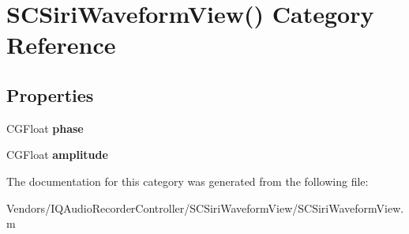 \hypertarget{category_s_c_siri_waveform_view_07_08}{}\section{S\+C\+Siri\+Waveform\+View() Category Reference}
\label{category_s_c_siri_waveform_view_07_08}
\subsection*{Properties}
\begin{DoxyCompactItemize}
\item 
\hypertarget{category_s_c_siri_waveform_view_07_08_a07e21c29861d2a9bd124efd422041512}{}C\+G\+Float {\bfseries phase}\label{category_s_c_siri_waveform_view_07_08_a07e21c29861d2a9bd124efd422041512}

\item 
\hypertarget{category_s_c_siri_waveform_view_07_08_a72038619f84c7eb4425541bae4c0bf8a}{}C\+G\+Float {\bfseries amplitude}\label{category_s_c_siri_waveform_view_07_08_a72038619f84c7eb4425541bae4c0bf8a}

\end{DoxyCompactItemize}


The documentation for this category was generated from the following file\+:\begin{DoxyCompactItemize}
\item 
Vendors/\+I\+Q\+Audio\+Recorder\+Controller/\+S\+C\+Siri\+Waveform\+View/S\+C\+Siri\+Waveform\+View.\+m\end{DoxyCompactItemize}
